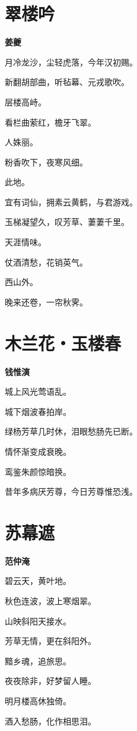 \documentclass[12pt,a4paper]{ctexbook}
\begin{document}
\section{翠楼吟}
\textbf{姜夔}\par\vspace{0.5em}
月冷龙沙，尘轻虎落，今年汉初赐。\par
新翻胡部曲，听毡幕、元戎歌吹。\par
层楼高峙。\par
看栏曲萦红，檐牙飞翠。\par
人姝丽。\par
粉香吹下，夜寒风细。\par
此地。\par
宜有词仙，拥素云黄鹤，与君游戏。\par
玉梯凝望久，叹芳草、萋萋千里。\par
天涯情味。\par
仗酒清愁，花销英气。\par
西山外。\par
晚来还卷，一帘秋霁。\par

\section{木兰花・玉楼春}
\textbf{钱惟演}\par\vspace{0.5em}
城上风光莺语乱。\par
城下烟波春拍岸。\par
绿杨芳草几时休，泪眼愁肠先已断。\par
情怀渐变成衰晚。\par
鸾鉴朱颜惊暗换。\par
昔年多病厌芳尊，今日芳尊惟恐浅。\par

\section{苏幕遮}
\textbf{范仲淹}\par\vspace{0.5em}
碧云天，黄叶地。\par
秋色连波，波上寒烟翠。\par
山映斜阳天接水。\par
芳草无情，更在斜阳外。\par
黯乡魂，追旅思。\par
夜夜除非，好梦留人睡。\par
明月楼高休独倚。\par
酒入愁肠，化作相思泪。\par
\end{document}
